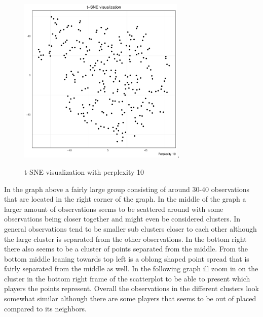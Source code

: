 \documentclass{article}
\begin{document}
\begin{figure}[H]
 \centering
 \includegraphics[height=8cm]{tsne10}.
 \caption{t-SNE visualization with perplexity 10}
 \label{figure:1}
\end{figure}

In the graph above a fairly large group consisting of around 30-40 observations that are located in the right corner of the graph. In the middle of the graph a larger amount of observations seems to be scattered around with some observations being closer together and might even be considered clusters. In general observations tend to be smaller sub clusters closer to each other although the large cluster is separated from the other observations. In the bottom right there also seems to be a cluster of points separated from the middle. From the bottom middle leaning towards top left is a oblong shaped point spread that is fairly separated from the middle as well. In the following graph ill zoom in on the cluster in the bottom right frame of the scatterplot to be able to present which players the points represent. Overall the observations in the different clusters look somewhat similar although there are some players that seems to be out of placed compared to its neighbors.


\end{document}

